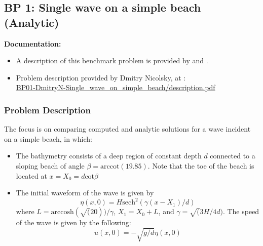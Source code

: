 \newsection
\subsection{BP 1: Single wave on a simple beach (Analytic)}

{\bf Documentation:} 
\begin{itemize}
\item A description of this benchmark problem is provided by \cite{bp-description} and \cite{SynolakisBernard:pmel135}.

\item Problem description provided by Dmitry Nicolsky, 
at \cite{bp-description}: \\
\href{https://github.com/rjleveque/nthmp-benchmark-problems/blob/master/BP01-DmitryN-Single_wave_on_simple_beach/description.pdf}
{BP01-DmitryN-Single\_wave\_on\_simple\_beach/description.pdf} 
\end{itemize} 

\subsubsection{Problem Description}
The focus is on comparing computed and analytic solutions for a wave incident on a simple beach, in which:
\begin{itemize}
\item The bathymetry consists of a deep region of constant depth $d$
connected to a sloping beach of angle $\beta = \text{arccot}(19.85)$. 
Note that the toe of the beach is located at $x = X_0 = d \text{cot} \beta$
\item The initial waveform of the wave is given by 
\begin{equation}
\eta(x,0) = H \text{sech}^2(\gamma (x - X_1)/d)
\end{equation}
where $L = \text{arccosh}(\sqrt(20))/\gamma$, $X_1 = X_0 + L$, 
and $\gamma = \sqrt(3H/4d)$. The speed of the wave is given by the following: 
\begin{equation}
u(x,0)=-\sqrt{g/d}\eta(x,0)
\end{equation}
\end{itemize}

